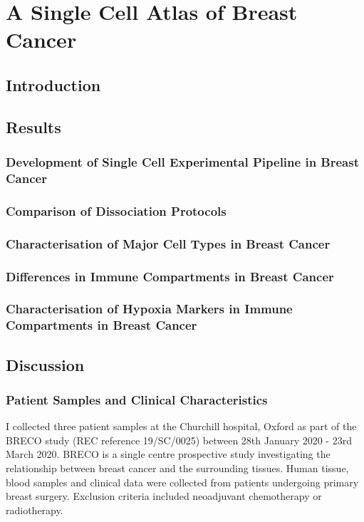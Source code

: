 \chapter{\label{ch:4}A Single Cell Atlas of Breast Cancer}

\minitoc

\section{Introduction}


\section{Results}

\subsection{Development of Single Cell Experimental Pipeline in Breast Cancer}
\subsection{Comparison of Dissociation Protocols}
\subsection{Characterisation of Major Cell Types in Breast Cancer}
\subsection{Differences in Immune Compartments in Breast Cancer}
\subsection{Characterisation of Hypoxia Markers in Immune Compartments in Breast Cancer}


\section{Discussion}

\subsection{Patient Samples and Clinical Characteristics}
I collected three patient samples at the Churchill hospital, Oxford as part of the BRECO study (REC reference 19/SC/0025) between 28th January 2020 - 23rd March 2020. BRECO is a single centre prospective study investigating the relationship between breast cancer and the surrounding tissues. Human tissue, blood samples and clinical data were collected from patients undergoing primary breast surgery. Exclusion criteria included neoadjuvant chemotherapy or radiotherapy.


